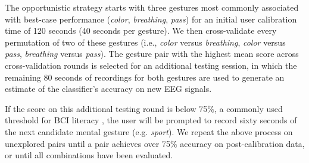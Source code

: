 The opportunistic strategy starts with three gestures most commonly associated with best-case performance (\textit{color}, \textit{breathing}, \textit{pass}) for an initial user calibration time of 120 seconds (40 seconds per gesture). We then cross-validate every permutation of two of these gestures (i.e., \textit{color} versus \textit{breathing}, \textit{color} versus \textit{pass}, \textit{breathing} versus \textit{pass}). The gesture pair with the highest mean score across cross-validation rounds is selected for an additional testing session, in which the remaining 80 seconds of recordings for both gestures are used to generate an estimate of the classifier's accuracy on new EEG signals.

If the score on this additional testing round is below 75\%, a commonly used threshold for BCI literacy \cite{vidaurre_towards_2010}, the user will be prompted to record sixty seconds of the next candidate mental gesture (e.g. \textit{sport}). We repeat the above process on unexplored pairs until a pair achieves over 75\% accuracy on post-calibration data, or until all combinations have been evaluated.

